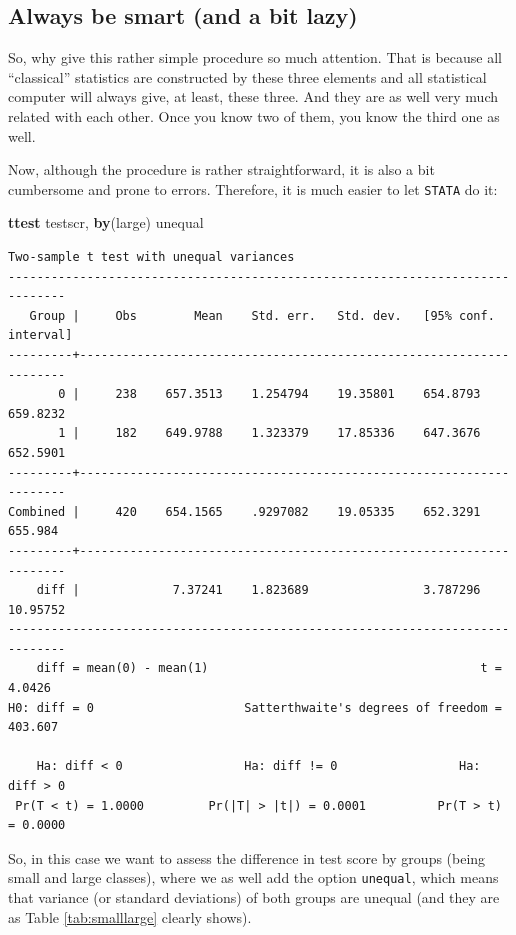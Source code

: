 \documentclass[
]{book}
\newenvironment{Shaded}{\begin{snugshade}}{\end{snugshade}}
\newcommand{\KeywordTok}[1]{\textcolor[rgb]{0.13,0.29,0.53}{\textbf{#1}}}
\newcommand{\NormalTok}[1]{#1}
\begin{document}
\hypertarget{sec:smart}{%
\subsection{Always be smart (and a bit lazy)}\label{sec:smart}}

So, why give this rather simple procedure so much attention. That is because all ``classical'' statistics are constructed by these three elements and all statistical computer will always give, at least, these three. And they are as well very much related with each other. Once you know two of them, you know the third one as well.

Now, although the procedure is rather straightforward, it is also a bit cumbersome and prone to errors. Therefore, it is much easier to let \texttt{STATA} do it:

\begin{Shaded}
\begin{Highlighting}[]
\KeywordTok{ttest}\NormalTok{ testscr, }\KeywordTok{by}\NormalTok{(large) unequal}
\end{Highlighting}
\end{Shaded}

\begin{verbatim}
Two-sample t test with unequal variances
------------------------------------------------------------------------------
   Group |     Obs        Mean    Std. err.   Std. dev.   [95% conf. interval]
---------+--------------------------------------------------------------------
       0 |     238    657.3513    1.254794    19.35801    654.8793    659.8232
       1 |     182    649.9788    1.323379    17.85336    647.3676    652.5901
---------+--------------------------------------------------------------------
Combined |     420    654.1565    .9297082    19.05335    652.3291     655.984
---------+--------------------------------------------------------------------
    diff |             7.37241    1.823689                3.787296    10.95752
------------------------------------------------------------------------------
    diff = mean(0) - mean(1)                                      t =   4.0426
H0: diff = 0                     Satterthwaite's degrees of freedom =  403.607

    Ha: diff < 0                 Ha: diff != 0                 Ha: diff > 0
 Pr(T < t) = 1.0000         Pr(|T| > |t|) = 0.0001          Pr(T > t) = 0.0000
\end{verbatim}

So, in this case we want to assess the difference in test score by groups (being small and large classes), where we as well add the option \texttt{unequal}, which means that variance (or standard deviations) of both groups are unequal (and they are as Table \ref{tab:smalllarge} clearly shows).
\end{document}
